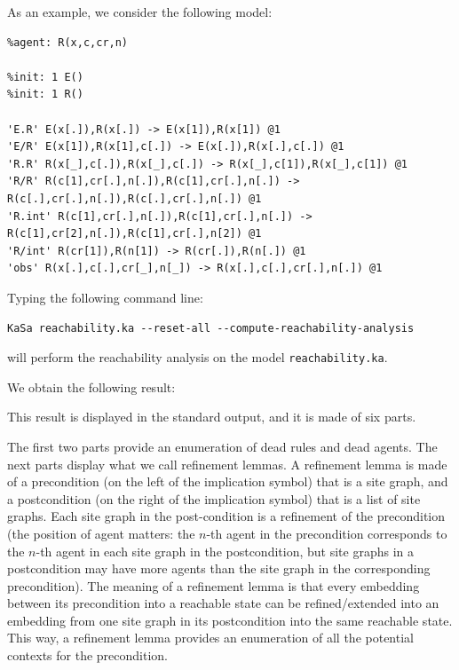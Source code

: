 \documentclass[11pt]{book}
\begin{document}
As an example, we consider the following model:
\begin{lstlisting}[language=kappa]
%agent: E(x)
%agent: R(x,c,cr,n)

%init: 1 E()
%init: 1 R()

'E.R' E(x[.]),R(x[.]) -> E(x[1]),R(x[1]) @1
'E/R' E(x[1]),R(x[1],c[.]) -> E(x[.]),R(x[.],c[.]) @1
'R.R' R(x[_],c[.]),R(x[_],c[.]) -> R(x[_],c[1]),R(x[_],c[1]) @1
'R/R' R(c[1],cr[.],n[.]),R(c[1],cr[.],n[.]) -> R(c[.],cr[.],n[.]),R(c[.],cr[.],n[.]) @1
'R.int' R(c[1],cr[.],n[.]),R(c[1],cr[.],n[.]) -> R(c[1],cr[2],n[.]),R(c[1],cr[.],n[2]) @1
'R/int' R(cr[1]),R(n[1]) -> R(cr[.]),R(n[.]) @1
'obs' R(x[.],c[.],cr[_],n[_]) -> R(x[.],c[.],cr[.],n[.]) @1
\end{lstlisting}

Typing the following command line:
\begin{verbatim}
KaSa reachability.ka --reset-all --compute-reachability-analysis
\end{verbatim}

will perform the reachability analysis on the model \texttt{reachability.ka}.

We obtain the following result:




This result is displayed in the standard output, and it is made of six parts.

The first two parts provide an enumeration of dead rules and dead agents.
The next parts display what we call refinement lemmas.
A refinement lemma is made of a precondition (on the left of the implication symbol) that is a site graph, and a postcondition (on the right of the implication symbol) that is a list of site graphs. Each site graph in the post-condition is a refinement of the precondition (the position of agent matters: the $n$-th agent in the precondition corresponds to the $n$-th agent in each site graph in the postcondition, but site graphs in a postcondition may have more agents than the site graph in the corresponding precondition).
The meaning of a refinement lemma is that every embedding between its precondition into a reachable state can be refined/extended into
an embedding from one site graph in its postcondition into the same reachable state. This way, a refinement lemma provides an enumeration of all the potential contexts for the precondition.
\end{document}

